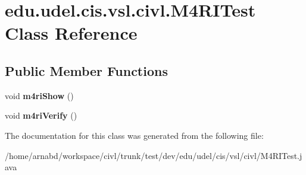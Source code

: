 \hypertarget{classedu_1_1udel_1_1cis_1_1vsl_1_1civl_1_1M4RITest}{}\section{edu.\+udel.\+cis.\+vsl.\+civl.\+M4\+R\+I\+Test Class Reference}
\label{classedu_1_1udel_1_1cis_1_1vsl_1_1civl_1_1M4RITest}
\subsection*{Public Member Functions}
\begin{DoxyCompactItemize}
\item 
\hypertarget{classedu_1_1udel_1_1cis_1_1vsl_1_1civl_1_1M4RITest_ab7dc00e4d102eccb65cf8925cd4c51b6}{}void {\bfseries m4ri\+Show} ()\label{classedu_1_1udel_1_1cis_1_1vsl_1_1civl_1_1M4RITest_ab7dc00e4d102eccb65cf8925cd4c51b6}

\item 
\hypertarget{classedu_1_1udel_1_1cis_1_1vsl_1_1civl_1_1M4RITest_ac93d686b0f7646d9b9b8f95feedf105e}{}void {\bfseries m4ri\+Verify} ()\label{classedu_1_1udel_1_1cis_1_1vsl_1_1civl_1_1M4RITest_ac93d686b0f7646d9b9b8f95feedf105e}

\end{DoxyCompactItemize}


The documentation for this class was generated from the following file\+:\begin{DoxyCompactItemize}
\item 
/home/arnabd/workspace/civl/trunk/test/dev/edu/udel/cis/vsl/civl/M4\+R\+I\+Test.\+java\end{DoxyCompactItemize}
